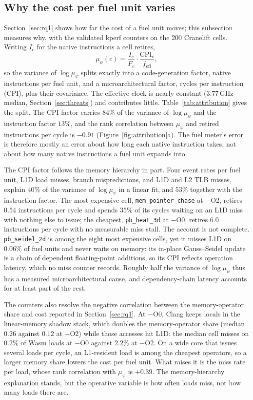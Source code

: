 \documentclass{ws-jcsc}
\begin{document}
\subsection{Why the cost per fuel unit varies}
\label{sec:attribution}
Section~\ref{sec:rq1} shows how far the cost of a fuel unit moves; this subsection measures why, with the validated kperf counters on the 200 Cranelift cells. Writing $I_c$ for the native instructions a cell retires,
\begin{equation}\label{eq:psi_factor}
\mu_\psi(c)=\frac{I_c}{F_c}\cdot\frac{\mathrm{CPI}_c}{f_{\mathrm{eff}}},
\end{equation}
so the variance of $\log\mu_\psi$ splits exactly into a code-generation factor, native instructions per fuel unit, and a microarchitectural factor, cycles per instruction (CPI), plus their covariance. The effective clock is nearly constant ($3.77$\,GHz median, Section~\ref{sec:threats}) and contributes little. Table~\ref{tab:attribution} gives the split. The CPI factor carries $84\%$ of the variance of $\log\mu_\psi$ and the instruction factor $13\%$, and the rank correlation between $\mu_\psi$ and retired instructions per cycle is $-0.91$ (Figure~\ref{fig:attribution}a). The fuel meter's error is therefore mostly an error about how long each native instruction takes, not about how many native instructions a fuel unit expands into.

The CPI factor follows the memory hierarchy in part. Four event rates per fuel unit, L1D load misses, branch mispredictions, and L1D and L2 TLB misses, explain $40\%$ of the variance of $\log\mu_\psi$ in a linear fit, and $53\%$ together with the instruction factor. The most expensive cell, \texttt{mem\_pointer\_chase} at $-$O2, retires $0.54$ instructions per cycle and spends $35\%$ of its cycles waiting on an L1D miss with nothing else to issue; the cheapest, \texttt{pb\_heat\_3d} at $-$O0, retires $6.0$ instructions per cycle with no measurable miss stall. The account is not complete. \texttt{pb\_seidel\_2d} is among the eight most expensive cells, yet it misses L1D on $0.06\%$ of fuel units and never waits on memory: its in-place Gauss--Seidel update is a chain of dependent floating-point additions, so its CPI reflects operation latency, which no miss counter records. Roughly half the variance of $\log\mu_\psi$ thus has a measured microarchitectural cause, and dependency-chain latency accounts for at least part of the rest.

The counters also resolve the negative correlation between the memory-operator share and cost reported in Section~\ref{sec:rq1}. At $-$O0, Clang keeps locals in the linear-memory shadow stack, which doubles the memory-operator share (median $0.26$ against $0.12$ at $-$O2) while those accesses hit L1D: the median cell misses on $0.2\%$ of Wasm loads at $-$O0 against $2.2\%$ at $-$O2. On a wide core that issues several loads per cycle, an L1-resident load is among the cheapest operators, so a larger memory share lowers the cost per fuel unit. What raises it is the miss rate per load, whose rank correlation with $\mu_\psi$ is $+0.39$. The memory-hierarchy explanation stands, but the operative variable is how often loads miss, not how many loads there are.
\end{document}
